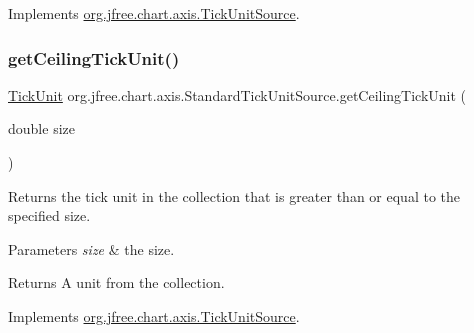 Implements \mbox{\hyperlink{interfaceorg_1_1jfree_1_1chart_1_1axis_1_1_tick_unit_source_a38db8c401c916244f48a758a8e8d469f}{org.\+jfree.\+chart.\+axis.\+Tick\+Unit\+Source}}.

\mbox{\label{classorg_1_1jfree_1_1chart_1_1axis_1_1_standard_tick_unit_source_a93fbb960c8e9c54bef76b7e147427f9d}} 
\subsubsection{\texorpdfstring{get\+Ceiling\+Tick\+Unit()}{getCeilingTickUnit()}\hspace{0.1cm}{\footnotesize\ttfamily [2/2]}}
{\footnotesize\ttfamily \mbox{\hyperlink{classorg_1_1jfree_1_1chart_1_1axis_1_1_tick_unit}{Tick\+Unit}} org.\+jfree.\+chart.\+axis.\+Standard\+Tick\+Unit\+Source.\+get\+Ceiling\+Tick\+Unit (\begin{DoxyParamCaption}\item[{double}]{size }\end{DoxyParamCaption})}

Returns the tick unit in the collection that is greater than or equal to the specified size.


\begin{DoxyParams}{Parameters}
{\em size} & the size.\\
\hline
\end{DoxyParams}
\begin{DoxyReturn}{Returns}
A unit from the collection. 
\end{DoxyReturn}


Implements \mbox{\hyperlink{interfaceorg_1_1jfree_1_1chart_1_1axis_1_1_tick_unit_source_a875d23e3610749f233950f61a855360d}{org.\+jfree.\+chart.\+axis.\+Tick\+Unit\+Source}}.

\mbox{\label{classorg_1_1jfree_1_1chart_1_1axis_1_1_standard_tick_unit_source_a0bb7142a99b046b49fd9c902adfae64a}} 
